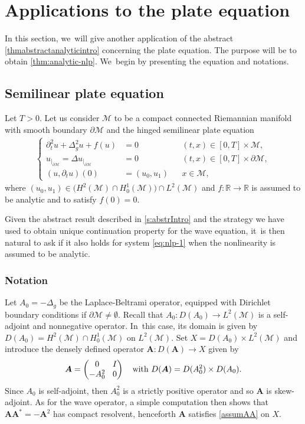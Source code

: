 \documentclass[10pt]{amsart}
\theoremstyle{definition}
\let\mc\mathcal
\newcommand{\M}{\mc{M}}
\newcommand{\R}{\mathbb{R}}
\newcommand{\bA}{\boldsymbol{A}}
\begin{document}
\section{Applications to the plate equation}\label{s:plate}
In this section, we~will give another application of the abstract \cref{thmabstractanalyticintro} concerning the plate equation. The purpose will be to obtain \cref{thm:analytic-nlp}. We~begin by presenting the equation and notations.
\subsection{Semilinear plate equation} Let $T>0$. Let us consider $\M$ to be a compact connected Riemannian manifold with smooth boundary $\partial\M$ and the hinged semilinear plate equation\vspace*{-3pt}
\begin{align}\label{eq:nlp-1}
\left\{\begin{aligned}
\partial_t^2 u+\Delta_g^2 u+f(u)&=0 &&(t, x)\in [0, T]\times \M,\\
u_{|_{\partial\M}}=\Delta u_{|_{\partial\M}}&=0 &&(t, x)\in [0, T]\times\partial\M,\\
(u, \partial_t u)(0)&=(u_0, u_1) &&x\in \M,
\end{aligned}\right.
\end{align}
where $(u_0, u_1)\in \big(H^2(\M)\cap H_0^1(\M)\big)\cap L^2(\M)$ and $f: \R\to \R$ is assumed to be analytic and to satisfy $f(0)=0$.

Given the abstract result described in \cref{s:abstrIntro} and the strategy we have used to obtain unique continuation property for the wave equation, it~is then natural to ask if it also holds for system \eqref{eq:nlp-1} when the nonlinearity is assumed to be analytic.

\subsubsection{Notation}\label{notplate} Let $A_0=-\Delta_g$ be the Laplace-Beltrami operator, equipped with Dirichlet boundary conditions if $\partial\M\neq\emptyset$. Recall that $A_0: D(A_0)\to L^2(\M)$ is a self-adjoint and nonnegative operator. In~this case, its domain is given by $D(A_0)=H^2(\M)\cap H_0^1(\M)$ on $L^2(\M)$. Set $X=D(A_0)\times L^2(\M)$ and introduce the densely defined operator $\bA: D(\bA)\to X$ given by
\begin{align*}\arraycolsep4.5pt
\bA=\begin{pmatrix}
0 & I \\
-A_0^2 & 0
\end{pmatrix}\quad \text{with } D(\bA)=D(A_0^2)\times D(A_0).
\end{align*}
Since $A_0$ is self-adjoint, then $A_0^2$ is a strictly positive operator and so $\bA$ is skew-adjoint. As for the wave operator, a simple computation then shows that $\bA\bA^*=-\bA^2$ has compact resolvent, henceforth $\bA$ satisfies \cref{assumAA} on $X$.
\end{document}

